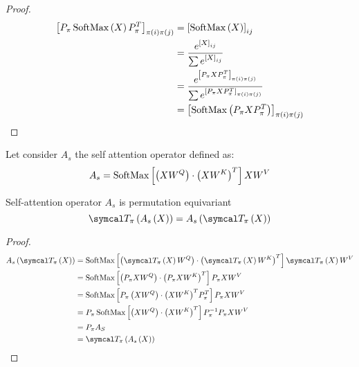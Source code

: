 \begin{proof}
	\begin{align*}
		{\left[P_{\pi}\operatorname{SoftMax}\left(X\right)P_{\pi}^T\right]}_{\pi(i)\pi(j)} & = {\left[\operatorname{SoftMax}\left(X\right)\right]}_{ij}                                                                           \\
		                                                                     & = \frac{e^{{\left[X\right]}_{ij}}}{\sum e^{{\left[X\right]}_{ij}}}                                                     \\
		                                                                     & = \frac{e^{{\left[P_{\pi}XP_{\pi}^T\right]}_{\pi(i)\pi(j)}}}{\sum e^{{\left[P_{\pi}XP_{\pi}^T\right]}_{\pi(i)\pi(j)}}} \\
		                                                                     & = {\left[\operatorname{SoftMax}\left(P_{\pi}XP_{\pi}^T\right)\right]}_{\pi(i)\pi(j)}
	\end{align*}
\end{proof}

Let consider \(A_s\) the self attention operator defined as:
\[A_s = \operatorname{SoftMax}\left[\left(XW^Q\right)\cdot{\left(XW^K\right)}^T \right]XW^V\]

\begin{theorem}
	Self-attention operator \(A_s\) is permutation equivariant
	\[\Tperm\left(A_s\left(X\right)\right) = A_s\left(\Tperm\left(X\right)\right)\]
\end{theorem}

\begin{proof}
	\begin{align*}
		A_s\left(\Tperm\left(X\right)\right) & = \softmax\left[ \left( \Tperm\left(X\right)W^Q\right) \cdot {\left(\Tperm\left(X\right)W^K\right)}^T \right] \Tperm\left(X\right)W^V \\
		                                     & = \softmax\left[ \left(P_{\pi}XW^Q\right)\cdot{\left(P_{\pi}XW^K\right)}^T  \right]P_{\pi}XW^V                                        \\
		                                     & = \softmax\left[ P_{\pi}\left(XW^Q\right)\cdot{\left(XW^K\right)}^T P_{\pi}^T  \right]P_{\pi}XW^V                                     \\
		                                     & = P_{\pi}\softmax\left[ \left(XW^Q\right)\cdot{\left(XW^K\right)}^T\right]P_{\pi}^{-1}P_{\pi}XW^V                                     \\
		                                     & = P_{\pi}A_S                                                                                                                          \\
		                                     & = \Tperm\left(A_s\left(X\right)\right)
	\end{align*}
\end{proof}
